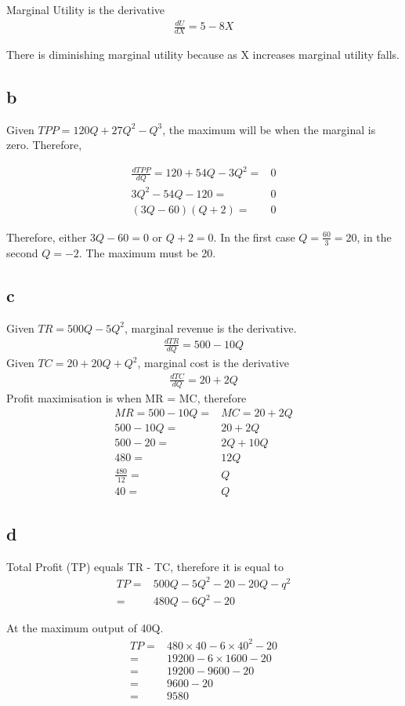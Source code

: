 \documentclass[12pt, a4paper, oneside]{article}\usepackage{graphicx, color}
\begin{document}
Marginal Utility is the derivative 
\begin{align*}
\frac{dU}{dX} = 5 - 8X
\end{align*}

There is diminishing marginal utility because as X increases marginal utility falls.

\subsection*{b}
Given $TPP = 120Q +27Q^2 -Q^3$, the maximum will be when the marginal is zero. Therefore, 

\begin{align*}
\frac{dTPP}{dQ} = 120 + 54Q - 3Q^2 =& 0\\
3Q^2 - 54Q -120 =& 0\\
(3Q - 60)(Q + 2) =&0
\end{align*}

Therefore, either $3Q -60 = 0$ or $Q + 2 = 0$.  In the first case $Q = \frac{60}{3} = 20$, in the second $Q = -2$.  The maximum must be 20. 

\subsection*{c}
Given $TR = 500Q - 5Q^2$, marginal revenue is the derivative. 
\begin{align*}
\frac{dTR}{dQ} = 500 - 10Q
\end{align*}
Given $TC = 20 +20Q +Q^2$, marginal cost is the derivative
\begin{align*}
\frac{dTC}{dQ} = 20 +2Q
\end{align*}
Profit maximisation is when MR = MC, therefore
\begin{align*}
MR = 500 - 10Q =& MC = 20 +2Q\\
500 - 10Q =& 20 +2Q\\
500 - 20 =& 2Q + 10Q\\
480 =& 12Q\\
\frac{480}{12} =& Q\\
40 =& Q
\end{align*}

\subsection*{d}
Total Profit (TP) equals TR - TC, therefore it is equal to 
\begin{align*}
TP =& 500Q - 5Q^2 - 20 -20Q - q^2\\
=& 480Q -6Q^2 -20
\end{align*}

At the maximum output of 40Q.
\begin{align*}
TP =& 480 \times 40 - 6 \times 40^2 - 20\\
=& 19200 - 6 \times 1600 - 20\\
=& 19200 - 9600 - 20\\
=& 9600 - 20\\
=& 9580
\end{align*}
\end{document}
